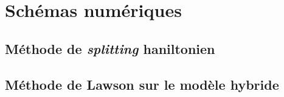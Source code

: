 
\section{Schémas numériques}

\subsection{Méthode de \emph{splitting} haniltonien}

\subsection{Méthode de Lawson sur le modèle hybride}
